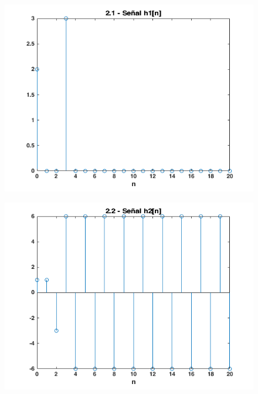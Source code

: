 \documentclass{article}
\begin{document}
\begin{figure} \caption[Figura 8]{}
	\centering
	\includegraphics[width=\linewidth]{./Figures/08.png}
\end{figure}

\begin{figure} \caption[Figura 9]{}
	\centering
	\includegraphics[width=\linewidth]{./Figures/09.png}
\end{figure}
\end{document}
